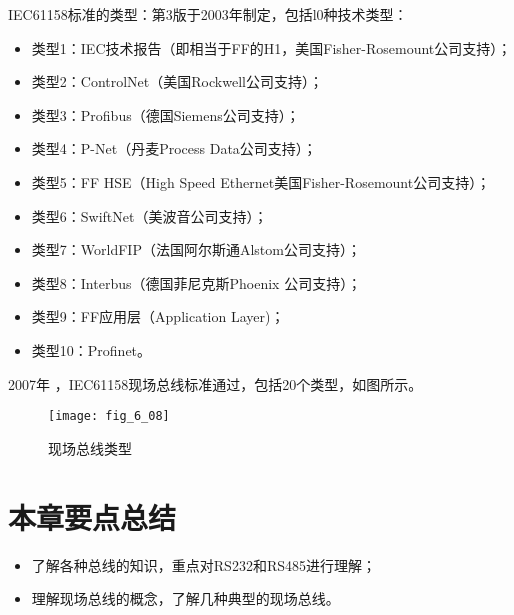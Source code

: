 IEC61158标准的类型：第3版于2003年制定，包括l0种技术类型：

\begin{itemize}

\item 类型1：IEC技术报告（即相当于FF的H1，美国Fisher-Rosemount公司支持）；
\item 类型2：ControlNet（美国Rockwell公司支持）；
\item 类型3：Profibus（德国Siemens公司支持）；
\item 类型4：P-Net（丹麦Process Data公司支持）；
\item 类型5：FF HSE（High Speed Ethernet美国Fisher-Rosemount公司支持）；
\item 类型6：SwiftNet（美波音公司支持）；
\item 类型7：WorldFIP（法国阿尔斯通Alstom公司支持）；
\item 类型8：Interbus（德国菲尼克斯Phoenix 公司支持）；
\item 类型9：FF应用层（Application Layer)；
\item 类型10：Profinet。
\end{itemize}


2007年 ，IEC61158现场总线标准通过，包括20个类型，如图所示。
\begin{figure}
  \centering
  \texttt{[image: fig\_6\_08]}
  \caption{现场总线类型}\label{fig_6_08}
\end{figure}




\section{本章要点总结}

\begin{itemize}
  \item 了解各种总线的知识，重点对RS232和RS485进行理解；

  \item 理解现场总线的概念，了解几种典型的现场总线。

\end{itemize}

